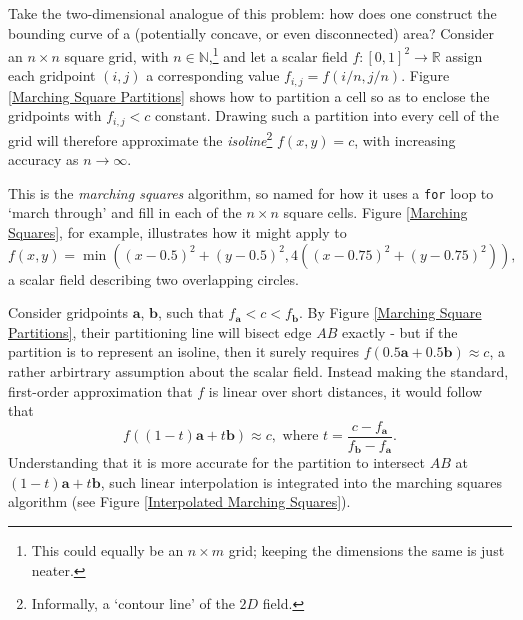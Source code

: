 \documentclass[a4paper, 11pt]{article}
\begin{document}
\begin{flushleft}
Take the two-dimensional analogue of this problem: how does one construct the bounding curve of a (potentially concave, or even disconnected) area? Consider an $n \times n$ square grid, with $n \in \mathbb{N}$,\footnote{This could equally be an $n \times m$ grid; keeping the dimensions the same is just neater.} and let a scalar field $f : [0,1]^2 \rightarrow \mathbb{R}$ assign each gridpoint $(i,j)$ a corresponding value $f_{i,j} = f(i/n,j/n)$. Figure \ref{Marching Square Partitions} shows how to partition a cell so as to enclose the gridpoints with $f_{i,j} < c$ constant. Drawing such a partition into every cell of the grid will therefore approximate the \textit{isoline}\footnote{Informally, a `contour line' of the $2D$ field.} $f(x,y) = c$, with increasing accuracy as $n \rightarrow \infty$.%



\vspace{5pt}\noindent
This is the \textit{marching squares} algorithm, so named for how it uses a \texttt{for} loop to `march through' and fill in each of the $n \times n$ square cells. Figure \ref{Marching Squares}, for example, illustrates how it might apply to 
$$f(x,y) = \min\left(\left(x-0.5\right)^2+\left(y-0.5\right)^2,4\left(\left(x-0.75\right)^2+\left(y-0.75\right)^2\right)\right),$$
a scalar field describing two overlapping circles.


\vspace{5pt}\noindent
Consider gridpoints $\mathbf{a}$, $\mathbf{b}$, such that $f_{\mathbf{a}} < c < f_{\mathbf{b}}$. By Figure \ref{Marching Square Partitions}, their partitioning line will bisect edge $AB$ exactly - but if the partition is to represent an isoline, then it surely requires $f\left(0.5\mathbf{a} + 0.5\mathbf{b}\right) \approx c$, a rather arbirtrary assumption about the scalar field. Instead making the standard, first-order approximation that $f$ is linear over short distances, it would follow that
$$f\left((1-t)\mathbf{a} + t\mathbf{b}\right) \approx c, \,\, \textrm{where} \,\, t = \frac{c-f_{\mathbf{a}}}{f_{\mathbf{b}}-f_{\mathbf{a}}}.$$
Understanding that it is more accurate for the partition to intersect $AB$ at $(1-t)\mathbf{a} + t\mathbf{b}$, such linear interpolation is integrated into the marching squares algorithm (see Figure \ref{Interpolated Marching Squares}).


\end{flushleft}
\end{document}
